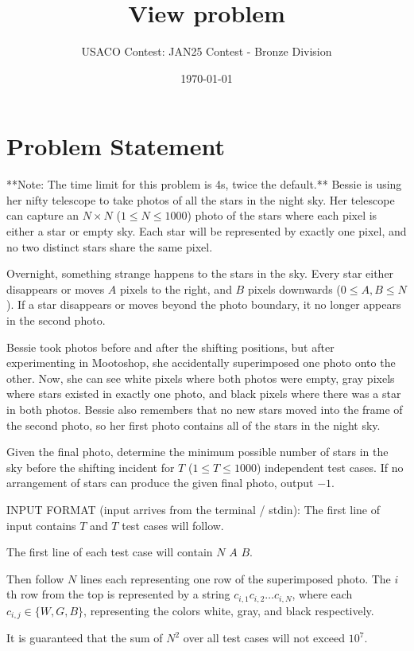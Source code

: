 \documentclass[12pt]{article}
\title{View problem}
\author{USACO Contest: JAN25 Contest - Bronze Division}
\date{\today}
\begin{document}
\maketitle

\section*{Problem Statement}


**Note: The time limit for this problem is 4s, twice the default.**
Bessie is using her nifty telescope to take photos of all the stars in the night
sky. Her telescope can capture an $N \times N$ ($1 \leq N \leq 1000$) photo of
the stars where each pixel is either a star or empty sky. Each star will be
represented by exactly one pixel, and no two distinct stars share the same
pixel.

Overnight, something strange happens to the stars in the sky. Every star either
disappears or moves $A$ pixels to the right, and $B$ pixels downwards
($0 \leq A,B \leq N$). If a star disappears or moves beyond the photo boundary,
it no longer appears in the second photo.

Bessie took photos before and after the shifting positions, but after
experimenting in  Mootoshop, she accidentally superimposed one photo onto the
other. Now, she can see white pixels where both photos were empty, gray pixels
where stars existed in exactly one photo, and black pixels where there was a
star in both photos. Bessie also remembers that no new stars moved into the
frame of the second photo, so her first photo contains all of the stars in the
night sky.

Given the final photo, determine the minimum possible number of stars in the sky
before the shifting incident for $T$ ($1 \leq T \leq 1000$) independent test
cases. If no arrangement of stars can produce the given final photo, output
$-1$.

INPUT FORMAT (input arrives from the terminal / stdin):
The first line of input contains $T$ and $T$ test cases will follow.

The first line of each test case will contain $N$ $A$ $B$.

Then follow $N$ lines each representing one row of the superimposed photo.  The
$i$th row from the top is represented by a string $c_{i,1}c_{i,2}\dots c_{i,N}$,
where each $c_{i,j} \in \{W,G,B\}$, representing the colors white, gray, and
black respectively.

It is guaranteed that the sum of $N^2$ over all test cases will not exceed
$10^7$.
\end{document}
